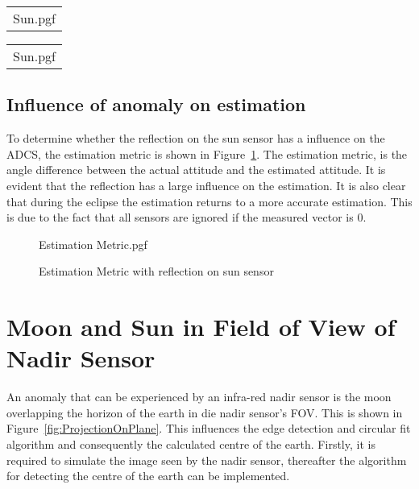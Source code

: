 \begin{figure*}[!htb]
	\begin{tabular}{@{}c@{}}
		\centering
		{Sun.pgf}
		\label{fig:Sun Vector comparison with reflection}
	\end{tabular}
	\begin{tabular}{@{}c@{}}
		\centering
		{Sun.pgf} 
		\label{fig:Sun Vector comparison without reflection}
	\end{tabular}
	
	\caption{Comparison of Sun Vector with and without Reflection}
	\label{fig:Sun Vector comparison}
	
\end{figure*}

\subsection{Influence of anomaly on estimation}
To determine whether the reflection on the sun sensor has a influence on the ADCS, the estimation metric is shown in Figure~\ref{fig:reflectionEstimation}. The estimation metric, is the angle difference between the actual attitude and the estimated attitude. It is evident that the reflection has a large influence on the estimation. It is also clear that during the eclipse the estimation returns to a more accurate estimation. This is due to the fact that all sensors are ignored if the measured vector is $0$.
\begin{figure}[!htb]
	\centering
	
	{Estimation Metric.pgf}
	
	\caption{Estimation Metric with reflection on sun sensor}
	\label{fig:reflectionEstimation}
\end{figure}

\section{Moon and Sun in Field of View of Nadir Sensor}
An anomaly that can be experienced by an infra-red nadir sensor is the moon overlapping the horizon of the earth in die nadir sensor's FOV. This is shown in Figure~\ref{fig:ProjectionOnPlane}. This influences the edge detection and circular fit algorithm \cite{Wessels2018, Helgard2008} and consequently the calculated centre of the earth. Firstly, it is required to simulate the image seen by the nadir sensor, thereafter the algorithm for detecting the centre of the earth can be implemented.

